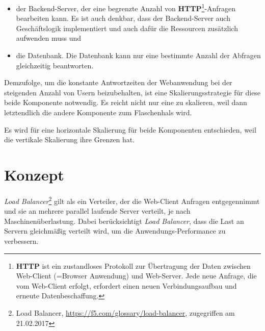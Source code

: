 \begin{itemize}

\item der Backend-Server, der eine begrenzte Anzahl von \textbf{HTTP}\footnote{\textbf{HTTP} ist ein zustandloses Protokoll zur Übertragung der Daten zwischen Web-Client (=Browser Anwendung) und Web-Server. Jede neue Anfrage, die vom Web-Client erfolgt, erfordert einen neuen Verbindungsaufbau und erneute Datenbeschaffung.}-Anfragen bearbeiten kann. Es ist auch denkbar, dass der Backend-Server auch Geschäftslogik implementiert und auch dafür die  Ressourcen zusätzlich aufwenden muss und

\item die Datenbank. Die Datenbank kann nur eine bestimmte Anzahl der Abfragen gleichzeitig beantworten.

\end{itemize}

Demzufolge, um die konstante Antwortzeiten der Webanwendung bei der steigenden Anzahl von Usern beizubehalten, ist eine Skalierungsstrategie für diese beide Komponente notwendig. Es reicht nicht nur eine zu skalieren, weil dann letztendlich die andere Komponente zum Flaschenhals wird.

Es wird für eine horizontale Skalierung für beide Komponenten entschieden, weil die vertikale Skalierung ihre Grenzen hat.

\section{Konzept}

\textit{Load Balancer}\footnote{Load Balancer, \url{https://f5.com/glossary/load-balancer}, zugegriffen am 21.02.2017} gilt als ein Verteiler, der die Web-Client Anfragen entgegennimmt und sie an mehrere parallel laufende Server verteilt, je nach Maschinenüberlastung. Dabei berücksichtigt \textit{Load Balancer}, dass die Last an Servern gleichmäßig verteilt wird, um die Anwendungs-Performance zu verbessern.

